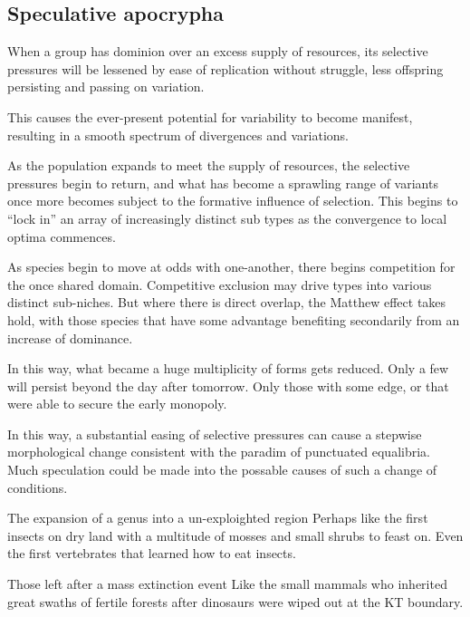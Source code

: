
\subsection*{Speculative apocrypha}



When a group has dominion over an excess supply of resources, its selective pressures will be lessened by ease of replication without struggle, less offspring persisting and passing on variation.

This causes the ever-present potential for variability to become manifest, resulting in a smooth spectrum of divergences and variations. 

As the population expands to meet the supply of resources, the selective pressures begin to return, and what has become a sprawling range of variants once more becomes subject to the formative influence of selection. This begins to ``lock in'' an array of increasingly distinct sub types as the convergence to local optima commences. 

As species begin to move at odds with one-another, there begins competition for the once shared domain. Competitive exclusion may drive types into various distinct sub-niches. But where there is direct overlap, the Matthew effect takes hold, with those species that have some advantage benefiting secondarily from an increase of dominance. 

In this way, what became a huge multiplicity of forms gets reduced. Only a few will persist beyond the day after tomorrow. Only those with some edge, or that were able to secure the early monopoly.

In this way, a substantial easing of selective pressures can cause a stepwise morphological change consistent with the paradim of punctuated equalibria. Much speculation could be made into the possable causes of such a change of conditions. 

The expansion of a genus into a un-exploighted region
Perhaps like the first insects on dry land with a multitude of mosses and small shrubs to feast on. 
Even the first vertebrates that learned how to eat insects. 

Those left after a mass extinction event
Like the small mammals who inherited great swaths of fertile forests after dinosaurs were wiped out at the KT boundary. 

